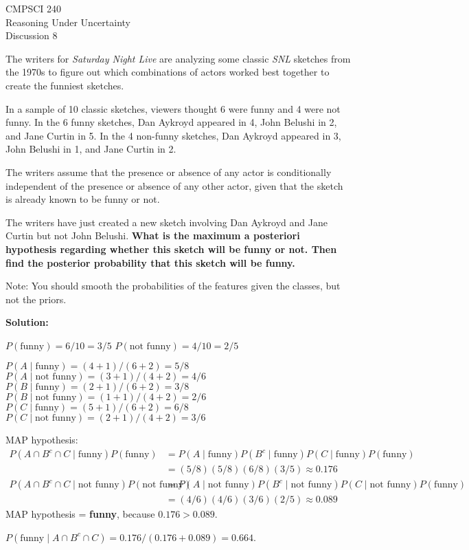 \documentclass[letterpaper,11pt,english,oneside]{article}
\begin{document}
\begin{center}
\LARGE CMPSCI 240\\
Reasoning Under Uncertainty\\
Discussion 8\\
\end{center}

The writers for \textit{Saturday Night Live} are analyzing some
classic \textit{SNL} sketches from the 1970s to figure out which
combinations of actors worked best together to create the funniest
sketches.

In a sample of 10 classic sketches, viewers thought 6 were funny and 4
were not funny. In the 6 funny sketches, Dan Aykroyd appeared in 4,
John Belushi in 2, and Jane Curtin in 5.  In the 4 non-funny sketches,
Dan Aykroyd appeared in 3, John Belushi in 1, and Jane Curtin in 2.

The writers assume that the presence or absence of any actor is
conditionally independent of the presence or absence of any other
actor, given that the sketch is already known to be funny or not.

The writers have just created a new sketch involving Dan Aykroyd and
Jane Curtin but not John Belushi.  \textbf{What is the maximum a
  posteriori hypothesis regarding whether this sketch will be funny or
  not.  Then find the posterior probability that this sketch will be
  funny.}

Note: You should smooth the probabilities of the features given the
classes, but not the priors.

\textbf{Solution:}



$P(\text{funny}) = 6/10 = 3/5$ \qquad \qquad\qquad \qquad
$P(\text{not funny}) = 4/10 = 2/5$



$P(A \mid \text{funny}) = (4+1) / (6+2) = 5/8$ \qquad $P(A \mid \text{not funny}) = (3+1) / (4+2) = 4/6$\\
$P(B \mid \text{funny}) = (2+1) / (6+2) = 3/8$ \qquad $P(B \mid \text{not funny}) = (1+1) / (4+2) = 2/6$\\
$P(C \mid \text{funny}) = (5+1) / (6+2) = 6/8$ \qquad $P(C \mid \text{not funny}) = (2+1) / (4+2) = 3/6$

MAP hypothesis:
\begin{align*}
P(A \cap B^c \cap C \mid \text{funny}) P(\text{funny})
  &=   P( A \mid \text{funny})  P(B^c \mid \text{funny})  P(C \mid \text{funny}) P(\text{funny})\\
  &= (5/8)(5/8)(6/8)(3/5) \approx 0.176\\
P(A \cap B^c \cap C \mid \text{not funny}) P(\text{not funny})
  &=   P( A \mid \text{not funny})  P(B^c \mid \text{not funny})  P(C \mid \text{not funny}) P(\text{funny})\\
  &= (4/6)(4/6)(3/6)(2/5) \approx 0.089
\end{align*}
MAP hypothesis = \textbf{funny}, because $0.176 > 0.089$.

$P(\text{funny} \mid A \cap B^c \cap C  ) = 0.176 / (0.176 + 0.089) = 0.664$.
\end{document}
